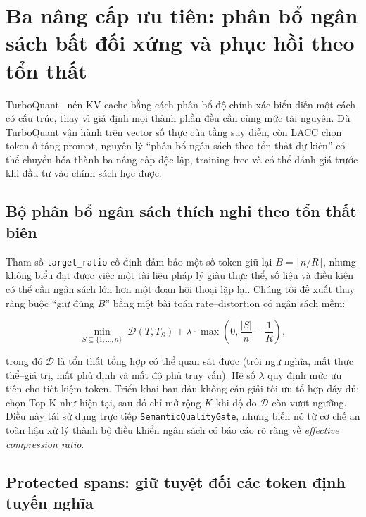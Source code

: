 \documentclass[12pt,a4paper]{article}
\newcommand{\method}[1]{\textsc{#1}}         %
\begin{document}
\section{Ba nâng cấp ưu tiên: phân bổ ngân sách bất đối xứng và phục hồi theo tổn thất}
\label{sec:turboquant-inspired}

TurboQuant~\cite{zandieh2025turboquant} nén KV cache bằng cách phân bổ độ chính xác biểu diễn một cách có cấu trúc, thay vì giả định mọi thành phần đều cần cùng mức tài nguyên. Dù TurboQuant vận hành trên vector số thực của tầng suy diễn, còn \method{LACC} chọn token ở tầng prompt, nguyên lý “phân bổ ngân sách theo tổn thất dự kiến” có thể chuyển hóa thành ba nâng cấp độc lập, training-free và có thể đánh giá trước khi đầu tư vào chính sách học được.

\subsection{Bộ phân bổ ngân sách thích nghi theo tổn thất biên}

Tham số \texttt{target\_ratio} cố định đảm bảo một số token giữ lại $B=\lfloor n/R\rfloor$, nhưng không biểu đạt được việc một tài liệu pháp lý giàu thực thể, số liệu và điều kiện có thể cần ngân sách lớn hơn một đoạn hội thoại lặp lại. Chúng tôi đề xuất thay ràng buộc “giữ đúng $B$” bằng một bài toán rate--distortion có ngân sách mềm:

\begin{equation}\label{eq:adaptive_budget}
    \min_{S \subseteq \{1,\ldots,n\}} \; \mathcal{D}(T, T_S) + \lambda \cdot \max\!\left(0, \frac{|S|}{n} - \frac{1}{R}\right),
\end{equation}

trong đó $\mathcal{D}$ là tổn thất tổng hợp có thể quan sát được (trôi ngữ nghĩa, mất thực thể--giá trị, mất phủ định và mất độ phủ truy vấn). Hệ số $\lambda$ quy định mức ưu tiên cho tiết kiệm token. Triển khai ban đầu không cần giải tối ưu tổ hợp đầy đủ: chọn Top-K như hiện tại, sau đó chỉ mở rộng $K$ khi độ đo $\mathcal{D}$ còn vượt ngưỡng. Điều này tái sử dụng trực tiếp \texttt{SemanticQualityGate}, nhưng biến nó từ cơ chế an toàn hậu xử lý thành bộ điều khiển ngân sách có báo cáo rõ ràng về \textit{effective compression ratio}.

\subsection{Protected spans: giữ tuyệt đối các token định tuyến nghĩa}
\end{document}
